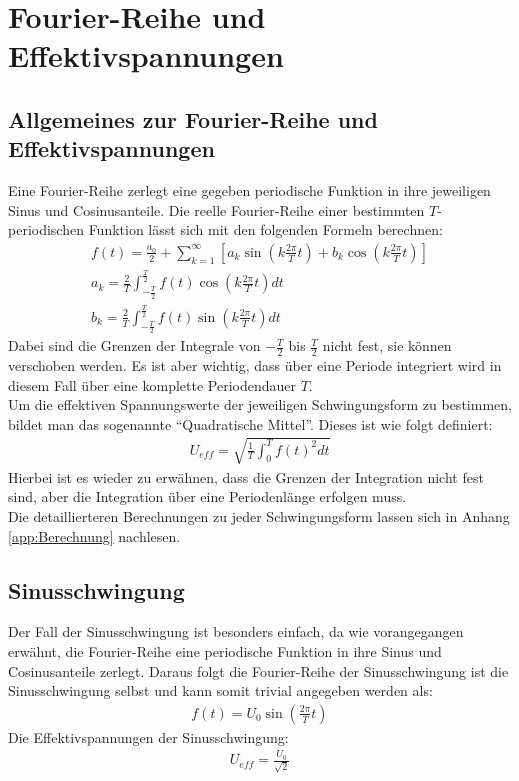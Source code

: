 \newpage
\section{Fourier-Reihe und Effektivspannungen}
\label{sec:fourierseries}
\subsection*{Allgemeines zur Fourier-Reihe und Effektivspannungen}
\label{sub:fourierseriesAllgemein}
Eine Fourier-Reihe zerlegt eine gegeben periodische Funktion in ihre jeweiligen Sinus und Cosinusanteile. Die reelle Fourier-Reihe einer bestimmten $T$-periodischen Funktion lässt sich mit den folgenden Formeln berechnen:
\begin{gather}
    f(t) = \frac{a_0}{2} + \sum^{\infty}_{k=1} \left[a_k \sin(k\frac{2\pi}{T} t) +b_k \cos(k\frac{2\pi}{T} t)\right]\\
    a_k = \frac{2}{T} \int^{\frac{T}{2}}_{-\frac{T}{2}} f(t)\cos(k \frac{2\pi}{T} t)dt\\
    b_k = \frac{2}{T} \int^{\frac{T}{2}}_{-\frac{T}{2}} f(t)\sin(k \frac{2\pi}{T} t)dt
\end{gather}
Dabei sind die Grenzen der Integrale von $-\frac{T}{2}$ bis $\frac{T}{2}$ nicht fest, sie können verschoben werden. Es ist aber wichtig, dass über eine Periode integriert wird in diesem Fall über eine komplette Periodendauer $T$.\\

Um die effektiven Spannungswerte der jeweiligen Schwingungsform zu bestimmen, bildet man das sogenannte \enquote{Quadratische Mittel}. Dieses ist wie folgt definiert:
\begin{gather}
    U_{eff} = \sqrt{\frac{1}{T}\int^T_0 f(t)^2 dt}
\end{gather}
Hierbei ist es wieder zu erwähnen, dass die Grenzen der Integration nicht fest sind, aber die Integration über eine Periodenlänge erfolgen muss.\\

Die detaillierteren Berechnungen zu jeder Schwingungsform lassen sich in Anhang \ref{app:Berechnung} nachlesen.

\subsection*{Sinusschwingung}
\label{sub:sinus}
Der Fall der Sinusschwingung ist besonders einfach, da wie vorangegangen erwähnt, die Fourier-Reihe eine periodische Funktion in ihre Sinus und Cosinusanteile zerlegt. Daraus folgt die Fourier-Reihe der Sinusschwingung ist die Sinusschwingung selbst und kann somit trivial angegeben werden als:
\begin{gather}
    \boxed{f(t) = U_0\sin(\frac{2\pi}{T} t)}
\end{gather}
Die Effektivspannungen der Sinusschwingung:
\begin{gather}
    \boxed{U_{eff}=\frac{U_0}{\sqrt{2}}}
\end{gather}
\newpage

